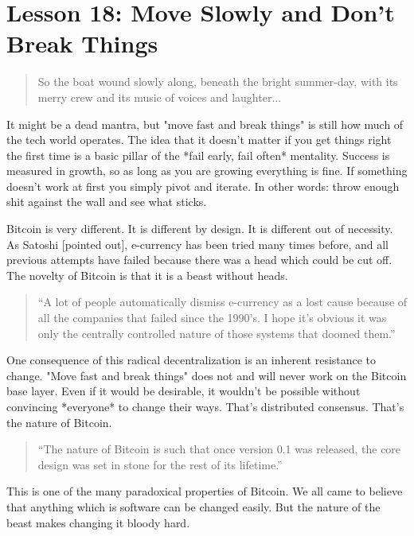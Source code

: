 \chapter{Lesson 18: Move Slowly and Don't Break Things}
\label{les:18}

\blockquote{
So the boat wound slowly along, beneath the bright summer-day, with its merry crew and its music of voices and laughter...
}

It might be a dead mantra, but "move fast and break things" is still how
much of the tech world operates. The idea that it doesn't matter if you
get things right the first time is a basic pillar of the *fail early,
fail often* mentality. Success is measured in growth, so as long as you
are growing everything is fine. If something doesn't work at first you
simply pivot and iterate. In other words: throw enough shit against the
wall and see what sticks.

Bitcoin is very different. It is different by design. It is different
out of necessity. As Satoshi [pointed out], e-currency has been tried
many times before, and all previous attempts have failed because there
was a head which could be cut off. The novelty of Bitcoin is that it is
a beast without heads.

\begin{quotation}
``A lot of people automatically dismiss e-currency as a lost cause
because of all the companies that failed since the 1990's. I hope it's
obvious it was only the centrally controlled nature of those systems
that doomed them.''
\end{quotation}

One consequence of this radical decentralization is an inherent
resistance to change. "Move fast and break things" does not and will
never work on the Bitcoin base layer. Even if it would be desirable, it
wouldn't be possible without convincing *everyone* to change their ways.
That's distributed consensus. That's the nature of Bitcoin.

\begin{quotation}
``The nature of Bitcoin is such that once version 0.1 was released, the
core design was set in stone for the rest of its lifetime.''
\end{quotation}

This is one of the many paradoxical properties of Bitcoin. We all came
to believe that anything which is software can be changed easily. But
the nature of the beast makes changing it bloody hard.

